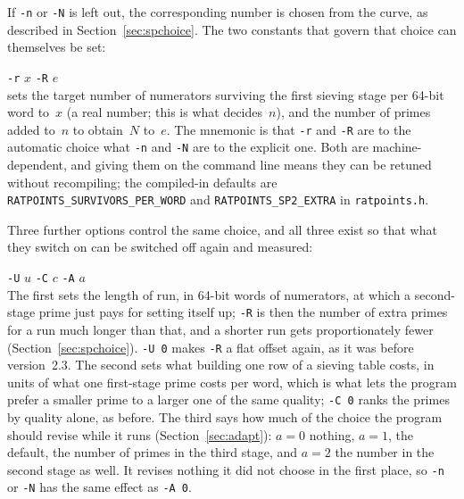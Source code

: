 \documentclass[12pt,a4paper,oneside]{amsart}
\begin{document}
If \verb+-n+ or \verb+-N+ is left out, the corresponding number is chosen
from the curve, as described in Section~\ref{sec:spchoice}. The two constants
that govern that choice can themselves be set: \\
\strut\quad\verb+-r+ $x$ \verb+-R+ $e$ \\
sets the target number of numerators surviving the first sieving stage per
64-bit word to~$x$ (a real number; this is what decides~$n$), and the number
of primes added to~$n$ to obtain~$N$ to~$e$. The mnemonic is that \verb+-r+ and
\verb+-R+ are to the automatic choice what \verb+-n+ and \verb+-N+ are to
the explicit one. Both are machine-dependent, and giving them on the command
line means they can be retuned without recompiling; the compiled-in defaults
are \texttt{RATPOINTS\_SURVIVORS\_PER\_WORD}
and \texttt{RATPOINTS\_SP2\_EXTRA} in \texttt{ratpoints.h}.

Three further options control the same choice, and all three exist so that
what they switch on can be switched off again and measured: \\
\strut\quad\verb+-U+ $u$ \quad\verb+-C+ $c$ \quad\verb+-A+ $a$ \\
The first sets the length of run, in 64-bit words of numerators, at which a
second-stage prime just pays for setting itself up; \verb+-R+ is then the
number of extra primes for a run much longer than that, and a shorter run
gets proportionately fewer (Section~\ref{sec:spchoice}). \verb+-U 0+ makes
\verb+-R+ a flat offset again, as it was before version~2.3. The second sets
what building one row of a sieving table costs, in units of what one
first-stage prime costs per word, which is what lets the program prefer a
smaller prime to a larger one of the same quality; \verb+-C 0+ ranks the
primes by quality alone, as before. The third says how much of the choice the program should revise while it
runs (Section~\ref{sec:adapt}): $a = 0$ nothing, $a = 1$, the default, the
number of primes in the third stage, and $a = 2$ the number in the second
stage as well. It revises nothing it did not choose in the first place, so
\verb+-n+ or \verb+-N+ has the same effect as \verb+-A 0+.
\end{document}
